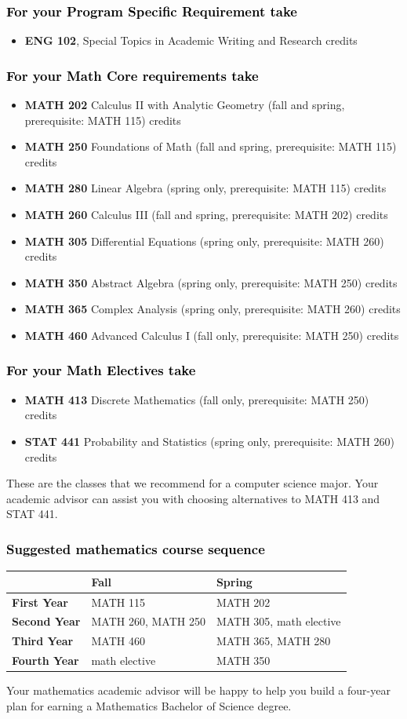 \documentclass[10pt]{article}
\newenvironment{mypar}[2]
   {\begin{list}{}%
     {\setlength\leftmargin{#1}
     \setlength\rightmargin{#2}}
     \item[]}
   {\end{list}}
\newcommand{\calconeshort}{MATH 115}
\newcommand{\calctwo}{\textbf{MATH 202} Calculus II with Analytic Geometry (fall and spring, prerequisite: MATH 115) \dotfill 5 credits }
\newcommand{\calctwoshort}{MATH 202}
\newcommand{\foundations}{\textbf{MATH 250} Foundations of Math (fall and spring, prerequisite: MATH 115)  \dotfill 3 credits}
\newcommand{\foundationsshort}{MATH 250}
\newcommand{\calcthree}{\textbf{MATH 260} Calculus III  (fall and spring, prerequisite: MATH 202) \dotfill 5 credits}
\newcommand{\calcthreeshort}{MATH 260}
\newcommand{\linear}{\textbf{MATH 280} Linear Algebra (spring only, prerequisite: MATH 115) \dotfill 3 credits}
\newcommand{\linearshort}{MATH 280}
\newcommand{\discrete}{\textbf{MATH 413} Discrete Mathematics  (fall only, prerequisite: MATH 250)\dotfill 3 credits}
\newcommand{\discreteshort}{MATH 413}
\newcommand{\statistics}{\textbf{STAT 441} Probability and Statistics (spring only, prerequisite: MATH 260)  \dotfill  3 credits}
\newcommand{\statisticsshort}{STAT 441}
\newcommand{\diffeq}{\textbf{MATH 305}	Differential Equations (spring only, prerequisite: MATH 260) \dotfill 	3 credits}
\newcommand{\diffeqshort}{MATH 305}
\newcommand{\abstractalgebra}{\textbf{MATH 350}	Abstract Algebra (spring only, prerequisite: MATH 250) \dotfill 	3 credits}
\newcommand{\abstractalgebrashort}{MATH 350}
\newcommand{\complex}{\textbf{MATH 365}	Complex Analysis (spring only,  prerequisite: MATH 260) \dotfill 3 credits}
\newcommand{\complexshort}{MATH 365}
\newcommand{\advancedcalc}{\textbf{MATH 460}	Advanced Calculus I  (fall only,   prerequisite: MATH 250) \dotfill 3 credits}
\newcommand{\advancedcalcshort}{MATH 460}
\newcommand{\mathBS}{
     \begin{center}
         \begin{tabular}[h]{| l | l | l|} 
            \hline
                       & \textbf{Fall}         &  \textbf{Spring}  \\ \hline 
            \textbf{First Year} & \calconeshort{}  & \calctwoshort \\  \hline
            \textbf{Second Year} &  \calcthreeshort{}, \foundationsshort & \diffeqshort, math elective \\ \hline
            \textbf{Third Year} & \advancedcalcshort              &  \complexshort{}, \linearshort \\ \hline
            \textbf{Fourth Year} & math elective &  \abstractalgebrashort  \\ \hline
         \end{tabular}
\end{center}}
\begin{document}
\subsubsection*{\textcolor{black}{For your Program Specific Requirement take}}

\begin{itemize}
   \item \textbf{ENG 102}, Special Topics in Academic Writing and Research  credits
\end{itemize}

	

\subsubsection*{\textcolor{black}{For your Math Core requirements take}}

\begin{itemize}
   \item \calctwo
   \item \foundations
   \item \linear
   \item \calcthree
   \item \diffeq
  \item \abstractalgebra
  \item \complex
  \item \advancedcalc
\end{itemize}



\subsubsection*{\textcolor{black}{For your  Math Electives take}}
\begin{itemize}
\item \discrete
\item \statistics
\end{itemize}
\vspace{0.1in}
These are the classes that we recommend for a computer science major.
Your academic advisor can assist you with choosing alternatives 
to \discreteshort{} and \statisticsshort{}.


\subsubsection*{\textcolor{black}{Suggested mathematics course sequence}}
   \mathBS
\begin{mypar}{0.5cm}{0.5cm}  Your mathematics academic advisor will be happy to help you build a four-year plan for earning a Mathematics Bachelor of Science degree. \end{mypar}
\end{document}
